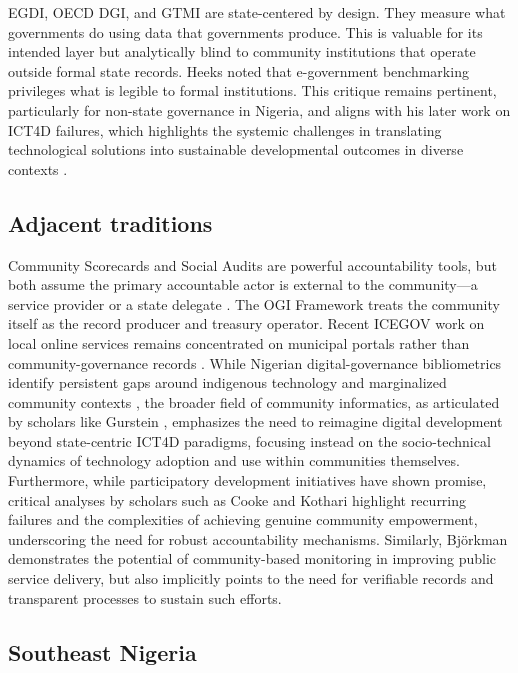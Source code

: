 \documentclass[sigconf,anonymous]{acmart}
\begin{document}
EGDI, OECD DGI, and GTMI are state-centered by design. They measure what governments do using data that governments produce. This is valuable for its intended layer but analytically blind to community institutions that operate outside formal state records. Heeks \cite{heeks2006} noted that e-government benchmarking privileges what is legible to formal institutions. This critique remains pertinent, particularly for non-state governance in Nigeria, and aligns with his later work on ICT4D failures, which highlights the systemic challenges in translating technological solutions into sustainable developmental outcomes in diverse contexts \cite{heeks2002, heeks2003}.

\subsection{Adjacent traditions}

Community Scorecards and Social Audits are powerful accountability tools, but both assume the primary accountable actor is external to the community—a service provider or a state delegate \cite{schouten2011, cooke2001}. The OGI Framework treats the community itself as the record producer and treasury operator. Recent ICEGOV work on local online services remains concentrated on municipal portals rather than community-governance records \cite{gasco2017, janowski2015}. While Nigerian digital-governance bibliometrics identify persistent gaps around indigenous technology and marginalized community contexts \cite{ifinedo2006}, the broader field of community informatics, as articulated by scholars like Gurstein \cite{gurstein2007}, emphasizes the need to reimagine digital development beyond state-centric ICT4D paradigms, focusing instead on the socio-technical dynamics of technology adoption and use within communities themselves. Furthermore, while participatory development initiatives have shown promise, critical analyses by scholars such as Cooke and Kothari \cite{cooke2001} highlight recurring failures and the complexities of achieving genuine community empowerment, underscoring the need for robust accountability mechanisms. Similarly, Björkman \cite{bjorkman2009} demonstrates the potential of community-based monitoring in improving public service delivery, but also implicitly points to the need for verifiable records and transparent processes to sustain such efforts.

\subsection{Southeast Nigeria}
\end{document}
